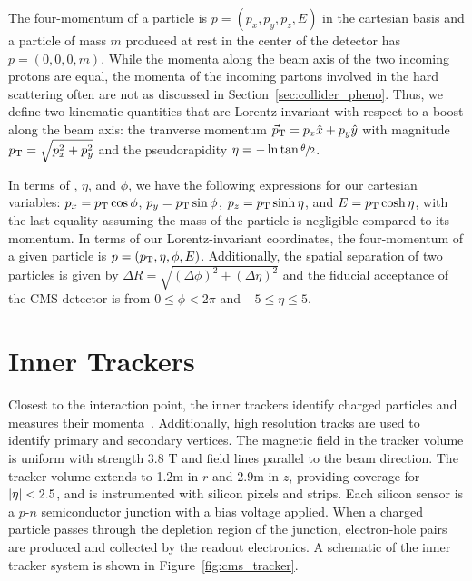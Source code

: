 The four-momentum of a particle is $p = (p_x, p_y, p_z, E)$ in the cartesian basis 
and a particle of mass $m$ produced at rest in the center of the detector has $p = (0, 0, 0, m)$.
While the momenta along the beam axis of the two incoming protons are equal, the momenta of the incoming partons involved in the hard scattering often are not as discussed in Section~\ref{sec:collider_pheno}.
Thus, we define two kinematic quantities that are Lorentz-invariant with respect to a boost along the beam axis:
the tranverse momentum ${\vec p}_{\mathrm{T}} = p_x \hat x + p_y \hat y$ with magnitude $p_{\mathrm{T}} = \sqrt{p_x^2 + p_y^2}$ and the pseudorapidity $\eta = - \ln \tan\sfrac{\theta}{2}$.

In terms of \pt, $\eta$, and $\phi$, we have the following expressions for our cartesian variables: $p_x = p_{\mathrm{T}} \cos \phi$, $p_y = p_{\mathrm{T}} \sin \phi$, $p_z = p_{\mathrm{T}} \sinh \eta$, and $E = p_{\mathrm{T}} \cosh \eta$, with the last equality assuming the mass of the particle is negligible compared to its momentum.
In terms of our Lorentz-invariant coordinates, the four-momentum of a given particle is $p = (p_{\mathrm{T}}, \eta, \phi, E)$. 
Additionally, the spatial separation of two particles is given by $\Delta R = \sqrt{(\Delta\phi)^2 + (\Delta\eta)^2}$ and the fiducial acceptance of the CMS detector is from $0 \le \phi < 2\pi$ and $-5 \le \eta \le 5$.

\section{Inner Trackers}
\label{sec:cms_tracker}

Closest to the interaction point, the inner trackers identify charged particles and measures their momenta~\cite{CMS2008}.
Additionally, high resolution tracks are used to identify primary and secondary vertices.
The magnetic field in the tracker volume is uniform with strength 3.8 T and field lines parallel to the beam direction. 
The tracker volume extends to 1.2\unit{m} in $r$ and 2.9\unit{m} in $z$, providing coverage for $\lvert \eta \rvert < 2.5$,  and is instrumented with silicon pixels and strips.
Each silicon sensor is a $p$-$n$ semiconductor junction with a bias voltage applied.
When a charged particle passes through the depletion region of the junction, electron-hole pairs are produced and collected by the readout electronics.
A schematic of the inner tracker system is shown in Figure~\ref{fig:cms_tracker}.

